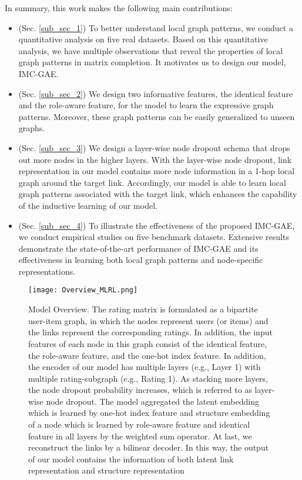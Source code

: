 \documentclass[sigconf]{acmart}
\begin{document}
In summary, this work makes the following main contributions:
\begin{itemize}[leftmargin=*]
    \item (Sec. \ref{sub_sec_1}) To better understand local graph patterns, we conduct a quantitative analysis on five real datasets. Based on this quantitative analysis, we have multiple observations that reveal the properties of local graph patterns in matrix completion. It motivates us to design our model, IMC-GAE. 
    \item (Sec. \ref{sub_sec_2}) We design two informative features, the identical feature and the role-aware feature, for the model to learn the expressive graph patterns. Moreover, these graph patterns can be easily generalized to unseen graphs.
    \item (Sec. \ref{sub_sec_3}) We design a layer-wise node dropout schema that drops out more nodes in the higher layers. With the layer-wise node dropout, link representation in our model contains more node information in a 1-hop local graph around the target link. Accordingly, our model is able to learn local graph patterns associated with the target link, which enhances the capability of the inductive learning of our model.
    \item (Sec. \ref{sub_sec_4}) To illustrate the effectiveness of the proposed IMC-GAE, we conduct empirical studies on five benchmark datasets. Extensive results demonstrate the state-of-the-art performance of IMC-GAE and its effectiveness in learning both local graph patterns and node-specific representations.
\end{itemize}










\begin{figure*}[!tp]
    \centering\texttt{[image: Overview\_MLRL.png]}
    \caption{Model Overview. The rating matrix is formulated as a bipartite user-item graph, in which the nodes represent users (or items) and the links represent the corresponding ratings. 
    In addition, the input features of each node in this graph consist of the identical feature, the role-aware feature, and the one-hot index feature. 
    In addition, the encoder of our model has multiple layers (e.g., Layer 1) with multiple rating-subgraph (e.g., Rating 1). 
    As stacking more layers, the node dropout probability increases, which is referred to as layer-wise node dropout. 
    The model aggregated the latent embedding which is learned by one-hot index feature and structure embedding of a node which is learned by role-aware feature and identical feature in all layers by the weighted sum operator. 
    At last, we reconstruct the links by a bilinear decoder. In this way, the output of our model contains the information of both latent link representation and structure representation}
    \label{fig:Overview}
\end{figure*}
\end{document}
